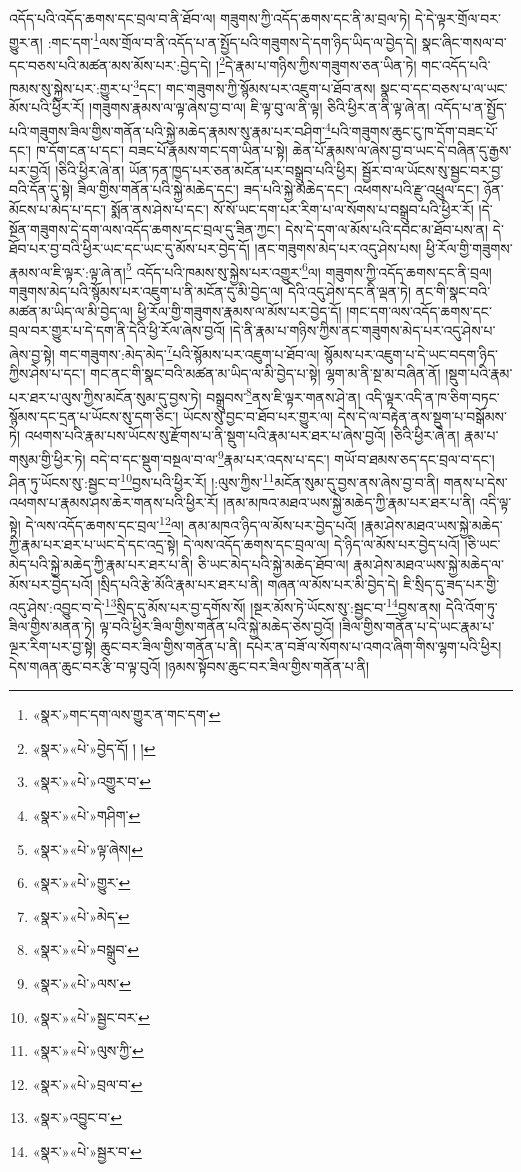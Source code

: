 འདོད་པའི་འདོད་ཆགས་དང་བྲལ་བ་ནི་ཐོབ་ལ། གཟུགས་ཀྱི་འདོད་ཆགས་དང་ནི་མ་བྲལ་ཏེ། དེ་དེ་ལྟར་གྲོལ་བར་གྱུར་ན། :གང་དག་\footnote{«སྣར་»གང་དག་ལས་གྱུར་ན་གང་དག་}ལས་གྲོལ་བ་ནི་འདོད་པ་ན་སྤྱོད་པའི་གཟུགས་དེ་དག་ཉིད་ཡིད་ལ་བྱེད་དེ། སྣང་ཞིང་གསལ་བ་དང་བཅས་པའི་མཚན་མས་མོས་པར་:བྱེད་དེ། །\footnote{«སྣར་»«པེ་»བྱེད་དོ། ། །}དེ་རྣམ་པ་གཉིས་ཀྱིས་གཟུགས་ཅན་ཡིན་ཏེ། གང་འདོད་པའི་ཁམས་སུ་སྐྱེས་པར་:གྱུར་པ་\footnote{«སྣར་»«པེ་»འགྱུར་བ་}དང་། གང་གཟུགས་ཀྱི་སྙོམས་པར་འཇུག་པ་ཐོབ་ནས། སྣང་བ་དང་བཅས་པ་ལ་ཡང་མོས་པའི་ཕྱིར་རོ། །གཟུགས་རྣམས་ལ་ལྟ་ཞེས་བྱ་བ་ལ། ཇི་ལྟ་བུ་ལ་ནི་ལྟ། ཅིའི་ཕྱིར་ན་ནི་ལྟ་ཞེ་ན། འདོད་པ་ན་སྤྱོད་པའི་གཟུགས་ཟིལ་གྱིས་གནོན་པའི་སྐྱེ་མཆེད་རྣམས་སུ་རྣམ་པར་བཤིག་\footnote{«སྣར་»«པེ་»གཤིག་}པའི་གཟུགས་ཆུང་ངུ་ཁ་དོག་བཟང་པོ་དང་། ཁ་དོག་ངན་པ་དང་། བཟང་པོ་རྣམས་གང་དག་ཡིན་པ་སྟེ། ཆེན་པོ་རྣམས་ལ་ཞེས་བྱ་བ་ཡང་དེ་བཞིན་དུ་རྒྱས་པར་བྱའོ། །ཅིའི་ཕྱིར་ཞེ་ན། ཡོན་ཏན་ཁྱད་པར་ཅན་མངོན་པར་བསྒྲུབ་པའི་ཕྱིར། སྦྱོར་བ་ལ་ཡོངས་སུ་སྦྱང་བར་བྱ་བའི་དོན་དུ་སྟེ། ཟིལ་གྱིས་གནོན་པའི་སྐྱེ་མཆེད་དང་། ཟད་པའི་སྐྱེ་མཆེད་དང་། འཕགས་པའི་རྫུ་འཕྲུལ་དང་། ཉོན་མོངས་པ་མེད་པ་དང་། སྨོན་ནས་ཤེས་པ་དང་། སོ་སོ་ཡང་དག་པར་རིག་པ་ལ་སོགས་པ་བསྒྲུབ་པའི་ཕྱིར་རོ། །དེ་སྔོན་གཟུགས་དེ་དག་ལས་འདོད་ཆགས་དང་བྲལ་དུ་ཟིན་ཀྱང་། དེས་དེ་དག་ལ་མོས་པའི་དབང་མ་ཐོབ་པས་ན། དེ་ཐོབ་པར་བྱ་བའི་ཕྱིར་ཡང་དང་ཡང་དུ་མོས་པར་བྱེད་དོ། །ནང་གཟུགས་མེད་པར་འདུ་ཤེས་པས། ཕྱི་རོལ་གྱི་གཟུགས་རྣམས་ལ་ཇི་ལྟར་:ལྟ་ཞེ་ན།\footnote{«སྣར་»«པེ་»ལྟ་ཞེས།} འདོད་པའི་ཁམས་སུ་སྐྱེས་པར་འགྱུར་\footnote{«སྣར་»«པེ་»གྱུར་}ལ། གཟུགས་ཀྱི་འདོད་ཆགས་དང་ནི་བྲལ། གཟུགས་མེད་པའི་སྙོམས་པར་འཇུག་པ་ནི་མངོན་དུ་མི་བྱེད་ལ། དེའི་འདུ་ཤེས་དང་ནི་ལྡན་ཏེ། ནང་གི་སྣང་བའི་མཚན་མ་ཡིད་ལ་མི་བྱེད་ལ། ཕྱི་རོལ་གྱི་གཟུགས་རྣམས་ལ་མོས་པར་བྱེད་དོ། །གང་དག་ལས་འདོད་ཆགས་དང་བྲལ་བར་གྱུར་པ་དེ་དག་ནི་དེའི་ཕྱི་རོལ་ཞེས་བྱའོ། །དེ་ནི་རྣམ་པ་གཉིས་ཀྱིས་ནང་གཟུགས་མེད་པར་འདུ་ཤེས་པ་ཞེས་བྱ་སྟེ། གང་གཟུགས་:མེད་མེད་\footnote{«སྣར་»«པེ་»མེད་}པའི་སྙོམས་པར་འཇུག་པ་ཐོབ་ལ། སྙོམས་པར་འཇུག་པ་དེ་ཡང་བདག་ཉིད་ཀྱིས་ཤེས་པ་དང་། གང་ནང་གི་སྣང་བའི་མཚན་མ་ཡིད་ལ་མི་བྱེད་པ་སྟེ། ལྷག་མ་ནི་སྔ་མ་བཞིན་ནོ། །སྡུག་པའི་རྣམ་པར་ཐར་པ་ལུས་ཀྱིས་མངོན་སུམ་དུ་བྱས་ཏེ། བསྒྲུབས་\footnote{«སྣར་»«པེ་»བསྒྲུབ་}ནས་ཇི་ལྟར་གནས་ཤེ་ན། འདི་ལྟར་འདི་ན་ཁ་ཅིག་བཏང་སྙོམས་དང་དྲན་པ་ཡོངས་སུ་དག་ཅིང་། ཡོངས་སུ་བྱང་བ་ཐོབ་པར་གྱུར་ལ། དེས་དེ་ལ་བརྟེན་ནས་སྡུག་པ་བསྒོམས་ཏེ། འཕགས་པའི་རྣམ་པས་ཡོངས་སུ་རྫོགས་པ་ནི་སྡུག་པའི་རྣམ་པར་ཐར་པ་ཞེས་བྱའོ། །ཅིའི་ཕྱིར་ཞེ་ན། རྣམ་པ་གསུམ་གྱི་ཕྱིར་ཏེ། བདེ་བ་དང་སྡུག་བསྔལ་བ་ལ་\footnote{«སྣར་»«པེ་»ལས་}རྣམ་པར་འདས་པ་དང་། གཡོ་བ་ཐམས་ཅད་དང་བྲལ་བ་དང་། ཤིན་ཏུ་ཡོངས་སུ་:སྦྱང་བ་\footnote{«སྣར་»«པེ་»སྦྱང་བར་}བྱས་པའི་ཕྱིར་རོ། །:ལུས་ཀྱིས་\footnote{«སྣར་»«པེ་»ལུས་ཀྱི་}མངོན་སུམ་དུ་བྱས་ནས་ཞེས་བྱ་བ་ནི། གནས་པ་དེས་འཕགས་པ་རྣམས་ཤས་ཆེར་གནས་པའི་ཕྱིར་རོ། །ནམ་མཁའ་མཐའ་ཡས་སྐྱེ་མཆེད་ཀྱི་རྣམ་པར་ཐར་པ་ནི། འདི་ལྟ་སྟེ། དེ་ལས་འདོད་ཆགས་དང་བྲལ་\footnote{«སྣར་»«པེ་»བྲལ་བ་}ལ། ནམ་མཁའ་ཉིད་ལ་མོས་པར་བྱེད་པའོ། །རྣམ་ཤེས་མཐའ་ཡས་སྐྱེ་མཆེད་ཀྱི་རྣམ་པར་ཐར་པ་ཡང་དེ་དང་འདྲ་སྟེ། དེ་ལས་འདོད་ཆགས་དང་བྲལ་ལ། དེ་ཉིད་ལ་མོས་པར་བྱེད་པའོ། །ཅི་ཡང་མེད་པའི་སྐྱེ་མཆེད་ཀྱི་རྣམ་པར་ཐར་པ་ནི། ཅི་ཡང་མེད་པའི་སྐྱེ་མཆེད་ཐོབ་ལ། རྣམ་ཤེས་མཐའ་ཡས་སྐྱེ་མཆེད་ལ་མོས་པར་བྱེད་པའོ། །སྲིད་པའི་རྩེ་མོའི་རྣམ་པར་ཐར་པ་ནི། གཞན་ལ་མོས་པར་མི་བྱེད་དེ། ཇི་སྲིད་དུ་ཟད་པར་གྱི་འདུ་ཤེས་:འབྱུང་བ་དེ་\footnote{«སྣར་»འབྱུང་བ་}སྲིད་དུ་མོས་པར་བྱ་དགོས་སོ། །སྔར་མོས་ཏེ་ཡོངས་སུ་:སྦྱང་བ་\footnote{«སྣར་»«པེ་»སྦྱར་བ་}བྱས་ནས། དེའི་འོག་ཏུ་ཟིལ་གྱིས་མནན་ཏེ། ལྟ་བའི་ཕྱིར་ཟིལ་གྱིས་གནོན་པའི་སྐྱེ་མཆེད་ཅེས་བྱའོ། །ཟིལ་གྱིས་གནོན་པ་དེ་ཡང་རྣམ་པ་ལྔར་རིག་པར་བྱ་སྟེ། ཆུང་བར་ཟིལ་གྱིས་གནོན་པ་ནི། དཔེར་ན་བཟོ་ལ་སོགས་པ་འགའ་ཞིག་གིས་ལྷག་པའི་ཕྱིར། དེས་གཞན་ཆུང་བར་རྩི་བ་ལྟ་བུའོ། །ཉམས་སྟོབས་ཆུང་བར་ཟིལ་གྱིས་གནོན་པ་ནི། 